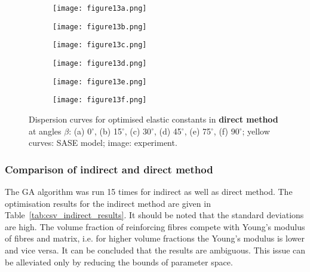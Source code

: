 \documentclass[preprint,12pt]{elsarticle}
\begin{document}
\begin{figure} [h!]
	\centering
	\begin{subfigure}[b]{0.49\textwidth}
		\centering
		\texttt{[image: figure13a.png]}
		\caption{}
		\label{fig:dispersion0deg_direct}
	\end{subfigure}
	\begin{subfigure}[b]{0.49\textwidth}
		\centering
		\texttt{[image: figure13b.png]}
		\caption{}
		\label{fig:dispersion15deg_direct}
	\end{subfigure}
	\begin{subfigure}[b]{0.49\textwidth}
		\centering
		\texttt{[image: figure13c.png]}
		\caption{}
		\label{fig:dispersion30deg_direct}
	\end{subfigure}
	\begin{subfigure}[b]{0.49\textwidth}
		\centering
		\texttt{[image: figure13d.png]}
		\caption{}
		\label{fig:dispersion45deg_direct}
	\end{subfigure}
	\begin{subfigure}[b]{0.49\textwidth}
		\centering
		\texttt{[image: figure13e.png]}
		\caption{}
		\label{fig:dispersion75deg_direct}
	\end{subfigure}
	\begin{subfigure}[b]{0.49\textwidth}
		\centering
		\texttt{[image: figure13f.png]}
		\caption{}
		\label{fig:dispersion90deg_direct}
	\end{subfigure}
	\caption{Dispersion curves for optimised elastic constants in \textbf{direct method} 
	at angles \(\beta\): (a) 0\(^{\circ}\), (b) 15\(^{\circ}\), (c) 30\(^{\circ}\), (d) 
	45\(^{\circ}\), 
	(e) 75\(^{\circ}\), (f) 90\(^{\circ}\); yellow curves: SASE model; image: experiment. }
	\label{fig:optimized_direct}
\end{figure}

\clearpage
\subsubsection{Comparison of indirect and direct method}
The GA algorithm was run 15 times for indirect as well as direct method. The optimisation results for the indirect  method are given in Table~\ref{tab:csv_indirect_results}. It should be noted that the standard deviations are high. The volume fraction of reinforcing fibres compete with Young’s modulus of fibres and matrix, i.e. for higher volume fractions the Young’s modulus is lower and vice versa. It can be concluded that the results are ambiguous. This issue can be alleviated only by reducing the bounds of parameter space.
\end{document}
